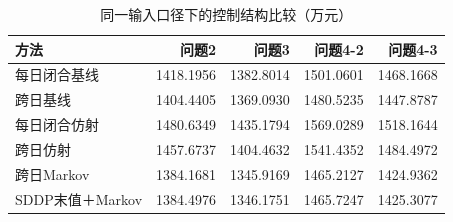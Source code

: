 \begin{table}[H]\centering\small\caption{同一输入口径下的控制结构比较（万元）}\label{tab:candidates}
\begin{tabular}{lrrrr}\toprule
方法 & 问题2 & 问题3 & 问题4-2 & 问题4-3\\\midrule
每日闭合基线 & 1418.1956 & 1382.8014 & 1501.0601 & 1468.1668\\
跨日基线 & 1404.4405 & 1369.0930 & 1480.5235 & 1447.8787\\
每日闭合仿射 & 1480.6349 & 1435.1794 & 1569.0289 & 1518.1644\\
跨日仿射 & 1457.6737 & 1404.4632 & 1541.4352 & 1484.4972\\
跨日Markov & 1384.1681 & 1345.9169 & 1465.2127 & 1424.9362\\
SDDP末值＋Markov & 1384.4976 & 1346.1751 & 1465.7247 & 1425.3077\\
\bottomrule\end{tabular}\end{table}
